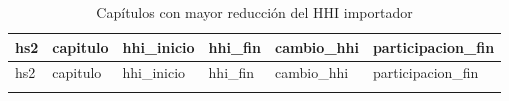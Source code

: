 \documentclass[
]{article}
\begin{document}
\begin{longtable}[]{@{}
  >{\raggedright\arraybackslash}p{}
  >{\raggedright\arraybackslash}p{}
  >{\raggedleft\arraybackslash}p{}
  >{\raggedleft\arraybackslash}p{}
  >{\raggedleft\arraybackslash}p{}
  >{\raggedleft\arraybackslash}p{}@{}}
\caption{Capítulos con mayor reducción del HHI
importador}\tabularnewline
\toprule\noalign{}
\begin{minipage}[b]{\linewidth}\raggedright
hs2
\end{minipage} & \begin{minipage}[b]{\linewidth}\raggedright
capitulo
\end{minipage} & \begin{minipage}[b]{\linewidth}\raggedleft
hhi\_inicio
\end{minipage} & \begin{minipage}[b]{\linewidth}\raggedleft
hhi\_fin
\end{minipage} & \begin{minipage}[b]{\linewidth}\raggedleft
cambio\_hhi
\end{minipage} & \begin{minipage}[b]{\linewidth}\raggedleft
participacion\_fin
\end{minipage} \\
\midrule\noalign{}
\endfirsthead
\toprule\noalign{}
\begin{minipage}[b]{\linewidth}\raggedright
hs2
\end{minipage} & \begin{minipage}[b]{\linewidth}\raggedright
capitulo
\end{minipage} & \begin{minipage}[b]{\linewidth}\raggedleft
hhi\_inicio
\end{minipage} & \begin{minipage}[b]{\linewidth}\raggedleft
hhi\_fin
\end{minipage} & \begin{minipage}[b]{\linewidth}\raggedleft
cambio\_hhi
\end{minipage} & \begin{minipage}[b]{\linewidth}\raggedleft
participacion\_fin
\end{minipage} \\
\midrule\noalign{}
\endhead

\end{longtable}
\end{document}
